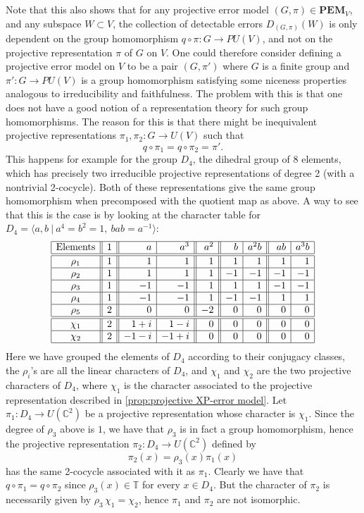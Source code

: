 \documentclass[11pt, oneside, reqno]{amsart}
\newcommand{\bbC}{\mathbb{C}}
\newcommand{\bbT}{\mathbb{T}}
\newcommand{\PEM}{\mathbf{PEM}}
\theoremstyle{definition}
\theoremstyle{plain}
\theoremstyle{remark}
\begin{document}
Note that this also shows that for any projective error model $(G,\pi) \in \PEM_V$, and any subspace $W \subset V$, the collection of detectable errors $D_{(G,\pi)}(W)$ is only dependent on the group homomorphism $q \circ \pi \colon G \to PU(V)$, and not on the projective representation $\pi$ of $G$ on $V$. One could therefore consider defining a projective error model on $V$ to be a pair $(G, \pi')$ where $G$ is a finite group and $\pi' \colon G \to PU(V)$ is a group homomorphism satisfying some niceness properties analogous to irreducibility and faithfulness. The problem with this is that one does not have a good notion of a representation theory for such group homomorphisms. The reason for this is that there might be inequivalent projective representations $\pi_1, \pi_2 \colon G \to U(V)$ such that
\begin{equation*}
    q \circ \pi_1 = q \circ \pi_2 = \pi'.
\end{equation*}
This happens for example for the group $D_4$, the dihedral group of $8$ elements, which has precisely two irreducible projective representations of degree 2 (with a nontrivial 2-cocycle). Both of these representations give the same group homomorphism when precomposed with the quotient map as above. A way to see that this is the case is by looking at the character table for $D_4 = \langle a, b \ | \ a^4 = b^2 = 1, \ bab = a^{-1} \rangle$:
\begin{equation*}
    \begin{array}{|c||r||r|r||r||r|r||r|r|}
        \hline
        \rm Elements & 1 & a & a^3 & a^2 & b & a^2b & ab & a^3b \cr
        \hline \hline
        \rho_{1} & 1 & 1 & 1 & 1 & 1 & 1 & 1 & 1 \cr\hline
        \rho_{2} & 1 & 1 & 1 & 1 & -1 & -1 & -1 & -1 \cr\hline
        \rho_{3} & 1 & -1 & -1 & 1 & 1 & 1 & -1 & -1 \cr\hline
        \rho_{4} & 1 & -1 & -1 & 1 & -1 & -1 & 1 & 1 \cr\hline
        \rho_{5} & 2 & 0 & 0 & -2 & 0 & 0 & 0 & 0 \cr\hline\hline
        \chi_{1} & 2 & 1 + i & 1 - i & 0 & 0 & 0 & 0 & 0 \cr\hline
        \chi_{2} & 2 & -1 - i & -1 + i & 0 & 0 & 0 & 0 & 0 \cr\hline
    \end{array}
\end{equation*}
Here we have grouped the elements of $D_4$ according to their conjugacy classes, the $\rho_i$'s are all the linear characters of $D_4$, and $\chi_1$ and $\chi_2$ are the two projective characters of $D_4$, where $\chi_1$ is the character associated to the projective representation described in \cref{prop:projective XP-error model}. Let $\pi_1 \colon D_4 \to U(\bbC^2)$ be a projective representation whose character is $\chi_1$. Since the degree of $\rho_3$ above is $1$, we have that $\rho_3$ is in fact a group homomorphism, hence the projective representation $\pi_2 \colon D_4 \to U(\bbC^2)$ defined by
\begin{equation*}
    \pi_2(x) = \rho_3(x)\pi_1(x)
\end{equation*}
has the same 2-cocycle associated with it as $\pi_1$. Clearly we have that $q \circ \pi_1 = q \circ \pi_2$ since $\rho_3(x) \in \bbT$ for every $x \in D_4$. But the character of $\pi_2$ is necessarily given by $\rho_3 \, \chi_1 = \chi_2$, hence $\pi_1$ and $\pi_2$ are not isomorphic.
\end{document}
